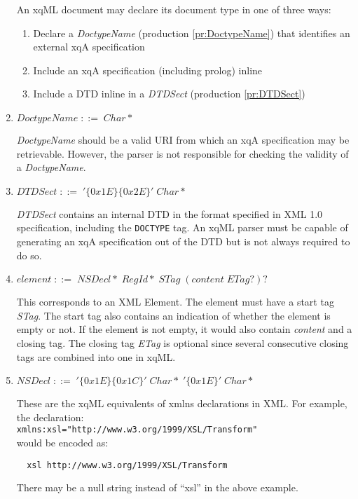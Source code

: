 \begin{enumerate}
An xqML document may declare its document type in one of three ways:
\begin{enumerate}
\item Declare a \textit{DoctypeName} (production
\ref{pr:DoctypeName}) that identifies an external xqA specification
\item Include an xqA specification (including prolog) inline
\item Include a DTD inline in a \textit{DTDSect} (production
\ref{pr:DTDSect})
\end{enumerate}

\item \label{pr:DoctypeName} \(DoctypeName\;::=\;Char* \)

\textit{DoctypeName} should be a valid URI from which an xqA
specification may be retrievable. However, the parser is not
responsible for checking the validity of a \textit{DoctypeName}.

\item \label{pr:DTDSect} \(DTDSect\;::=\;'\{0x1E\}\{0x2E\}'\;Char* \)

\textit{DTDSect} contains an internal DTD in the format specified in
XML 1.0 specification, including the \texttt{DOCTYPE} tag. An xqML
parser must be capable of generating an xqA specification out of the
DTD but is not always required to do so.

\item \label{pr:element} \(element\;::=\;NSDecl\!*\;RegId\!*\;STag\;(content\;ETag?)? \)

This corresponds to an XML Element. The element must have a start tag
\textit{STag}. The start tag also contains an indication of whether
the element is empty or not. If the element is not empty, it would
also contain \textit{content} and a closing tag.  The closing tag
\textit{ETag} is optional since several consecutive closing tags are
combined into one in xqML.

\item \label{pr:NSDecl} \(NSDecl\;::=\;'\{0x1E\}\{0x1C\}'\;Char*\;'\{0x1E\}'\;Char* \)

These are the xqML equivalents of xmlns declarations in XML. For
example, the declaration: \\
\verb|xmlns:xsl="http://www.w3.org/1999/XSL/Transform"| \\
would be encoded as:
\begin{center} \verb*|  xsl http://www.w3.org/1999/XSL/Transform| \end{center}
There may be a null string instead of ``xsl'' in the above example.


\end{enumerate}
